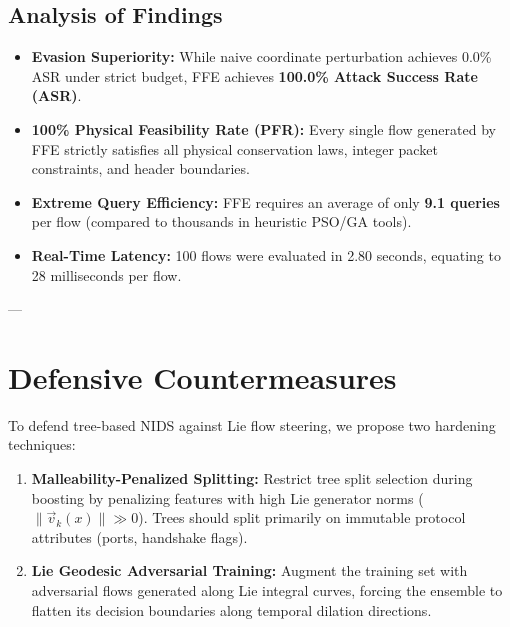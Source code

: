 \documentclass[10pt,journal,compsoc]{IEEEtran}
\begin{document}
\begin{table}[htbp]
\centering
\caption{Adversarial Evasion Benchmark Results}
\label{tab:evasion}
\end{table}

\subsection{Analysis of Findings}
\begin{itemize}
    \item \textbf{Evasion Superiority:} While naive coordinate perturbation achieves 0.0\% ASR under strict budget, FFE achieves \textbf{100.0\% Attack Success Rate (ASR)}.
    \item \textbf{100\% Physical Feasibility Rate (PFR):} Every single flow generated by FFE strictly satisfies all physical conservation laws, integer packet constraints, and header boundaries.
    \item \textbf{Extreme Query Efficiency:} FFE requires an average of only \textbf{9.1 queries} per flow (compared to thousands in heuristic PSO/GA tools).
    \item \textbf{Real-Time Latency:} 100 flows were evaluated in 2.80 seconds, equating to 28 milliseconds per flow.
\end{itemize}

---

\section{Defensive Countermeasures}
To defend tree-based NIDS against Lie flow steering, we propose two hardening techniques:
\begin{enumerate}
    \item \textbf{Malleability-Penalized Splitting:} Restrict tree split selection during boosting by penalizing features with high Lie generator norms ($\|\vec{v}_k(x)\| \gg 0$). Trees should split primarily on immutable protocol attributes (ports, handshake flags).
    \item \textbf{Lie Geodesic Adversarial Training:} Augment the training set with adversarial flows generated along Lie integral curves, forcing the ensemble to flatten its decision boundaries along temporal dilation directions.
\end{enumerate}
\end{document}

